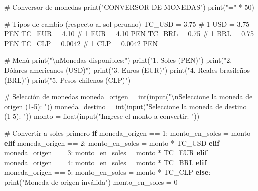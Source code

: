 \documentclass[
  doc,
  floatsintext,
  longtable,
  a4paper,
  nolmodern,
  notxfonts,
  notimes,
  12pt,
  colorlinks=true,linkcolor=blue,citecolor=blue,urlcolor=blue]{apa7}
\newenvironment{Shaded}{\begin{snugshade}}{\end{snugshade}}
\newcommand{\BuiltInTok}[1]{\textcolor[rgb]{0.00,0.23,0.31}{#1}}
\newcommand{\CharTok}[1]{\textcolor[rgb]{0.13,0.47,0.30}{#1}}
\newcommand{\CommentTok}[1]{\textcolor[rgb]{0.37,0.37,0.37}{#1}}
\newcommand{\ControlFlowTok}[1]{\textcolor[rgb]{0.00,0.23,0.31}{\textbf{#1}}}
\newcommand{\DecValTok}[1]{\textcolor[rgb]{0.68,0.00,0.00}{#1}}
\newcommand{\FloatTok}[1]{\textcolor[rgb]{0.68,0.00,0.00}{#1}}
\newcommand{\NormalTok}[1]{\textcolor[rgb]{0.00,0.23,0.31}{#1}}
\newcommand{\OperatorTok}[1]{\textcolor[rgb]{0.37,0.37,0.37}{#1}}
\newcommand{\StringTok}[1]{\textcolor[rgb]{0.13,0.47,0.30}{#1}}
\begin{document}
\begin{Shaded}
\begin{Highlighting}[]
\CommentTok{\# Conversor de monedas}
\BuiltInTok{print}\NormalTok{(}\StringTok{"CONVERSOR DE MONEDAS"}\NormalTok{)}
\BuiltInTok{print}\NormalTok{(}\StringTok{"="} \OperatorTok{*} \DecValTok{50}\NormalTok{)}

\CommentTok{\# Tipos de cambio (respecto al sol peruano)}
\NormalTok{TC\_USD }\OperatorTok{=} \FloatTok{3.75}  \CommentTok{\# 1 USD = 3.75 PEN}
\NormalTok{TC\_EUR }\OperatorTok{=} \FloatTok{4.10}  \CommentTok{\# 1 EUR = 4.10 PEN}
\NormalTok{TC\_BRL }\OperatorTok{=} \FloatTok{0.75}  \CommentTok{\# 1 BRL = 0.75 PEN}
\NormalTok{TC\_CLP }\OperatorTok{=} \FloatTok{0.0042}  \CommentTok{\# 1 CLP = 0.0042 PEN}

\CommentTok{\# Menú}
\BuiltInTok{print}\NormalTok{(}\StringTok{"}\CharTok{\textbackslash{}n}\StringTok{Monedas disponibles:"}\NormalTok{)}
\BuiltInTok{print}\NormalTok{(}\StringTok{"1. Soles (PEN)"}\NormalTok{)}
\BuiltInTok{print}\NormalTok{(}\StringTok{"2. Dólares americanos (USD)"}\NormalTok{)}
\BuiltInTok{print}\NormalTok{(}\StringTok{"3. Euros (EUR)"}\NormalTok{)}
\BuiltInTok{print}\NormalTok{(}\StringTok{"4. Reales brasileños (BRL)"}\NormalTok{)}
\BuiltInTok{print}\NormalTok{(}\StringTok{"5. Pesos chilenos (CLP)"}\NormalTok{)}

\CommentTok{\# Selección de monedas}
\NormalTok{moneda\_origen }\OperatorTok{=} \BuiltInTok{int}\NormalTok{(}\BuiltInTok{input}\NormalTok{(}\StringTok{"}\CharTok{\textbackslash{}n}\StringTok{Seleccione la moneda de origen (1{-}5): "}\NormalTok{))}
\NormalTok{moneda\_destino }\OperatorTok{=} \BuiltInTok{int}\NormalTok{(}\BuiltInTok{input}\NormalTok{(}\StringTok{"Seleccione la moneda de destino (1{-}5): "}\NormalTok{))}
\NormalTok{monto }\OperatorTok{=} \BuiltInTok{float}\NormalTok{(}\BuiltInTok{input}\NormalTok{(}\StringTok{"Ingrese el monto a convertir: "}\NormalTok{))}

\CommentTok{\# Convertir a soles primero}
\ControlFlowTok{if}\NormalTok{ moneda\_origen }\OperatorTok{==} \DecValTok{1}\NormalTok{:}
\NormalTok{    monto\_en\_soles }\OperatorTok{=}\NormalTok{ monto}
\ControlFlowTok{elif}\NormalTok{ moneda\_origen }\OperatorTok{==} \DecValTok{2}\NormalTok{:}
\NormalTok{    monto\_en\_soles }\OperatorTok{=}\NormalTok{ monto }\OperatorTok{*}\NormalTok{ TC\_USD}
\ControlFlowTok{elif}\NormalTok{ moneda\_origen }\OperatorTok{==} \DecValTok{3}\NormalTok{:}
\NormalTok{    monto\_en\_soles }\OperatorTok{=}\NormalTok{ monto }\OperatorTok{*}\NormalTok{ TC\_EUR}
\ControlFlowTok{elif}\NormalTok{ moneda\_origen }\OperatorTok{==} \DecValTok{4}\NormalTok{:}
\NormalTok{    monto\_en\_soles }\OperatorTok{=}\NormalTok{ monto }\OperatorTok{*}\NormalTok{ TC\_BRL}
\ControlFlowTok{elif}\NormalTok{ moneda\_origen }\OperatorTok{==} \DecValTok{5}\NormalTok{:}
\NormalTok{    monto\_en\_soles }\OperatorTok{=}\NormalTok{ monto }\OperatorTok{*}\NormalTok{ TC\_CLP}
\ControlFlowTok{else}\NormalTok{:}
    \BuiltInTok{print}\NormalTok{(}\StringTok{"Moneda de origen inválida"}\NormalTok{)}
\NormalTok{    monto\_en\_soles }\OperatorTok{=} \DecValTok{0}


\end{Highlighting}
\end{Shaded}
\end{document}
